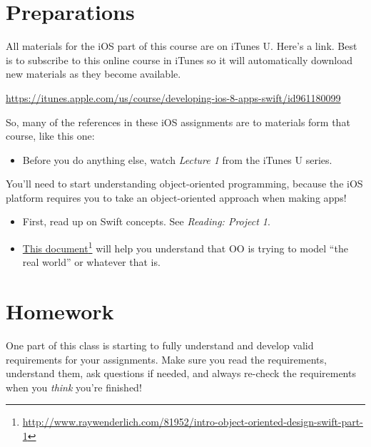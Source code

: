 \chapter{Preparations}
\label{preparations}

All materials for the iOS part of this course are on iTunes U. Here's a link. Best is to subscribe to this online course in iTunes so it will automatically download new materials as they become available.

\href{https://itunes.apple.com/us/course/developing-ios-8-apps-swift/id961180099}{https:/\slash itunes.apple.com\slash us\slash course\slash developing-ios-8-apps-swift\slash id961180099}

So, many of the references in these iOS assignments are to materials form that course, like this one:

\begin{itemize}
\item Before you do anything else, watch \emph{Lecture 1} from the iTunes U series.

\end{itemize}

You'll need to start understanding object-oriented programming, because the iOS platform requires you to take an object-oriented approach when making apps!

\begin{itemize}
\item First, read up on Swift concepts. See \emph{Reading: Project 1}.

\item \href{http://www.raywenderlich.com/81952/intro-object-oriented-design-swift-part-1}{This document}\footnote{\href{http://www.raywenderlich.com/81952/intro-object-oriented-design-swift-part-1}{http:/\slash www.raywenderlich.com\slash 81952\slash intro-object-oriented-design-swift-part-1}} will help you understand that OO is trying to model ``the real world'' or whatever that is.

\end{itemize}

\chapter{Homework}
\label{homework}

One part of this class is starting to fully understand and develop valid requirements for your assignments. Make sure you read the requirements, understand them, ask questions if needed, and always re-check the requirements when you \emph{think} you're finished!

